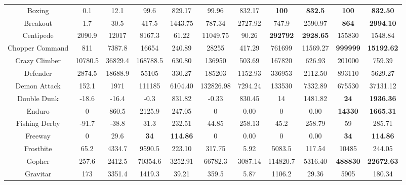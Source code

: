 \documentclass[nohyperref]{article}
\newcommand{\best}[1]{\textbf{#1}}
\theoremstyle{plain}
\begin{document}
\begin{table}[!hb]
\begin{center}
\begin{tabular}{ |c| c| c| c c| c c| c c| c c| }
 Boxing  & 0.1  & 12.1              & 99.6 & 829.17      & 99.96    & 832.17 & \textbf{100} & \textbf{832.5}        &\best{100}        &\best{832.50}        \\
 Breakout & 1.7 & 30.5              & 417.5 & 1443.75    & 787.34   & 2727.92 & 747.9 & 2590.97                     &\best{864}        &\best{2994.10}      \\
 Centipede & 2090.9 & 12017         & 8167.3 & 61.22   & 11049.75 & 90.26   & \textbf{292792} & \textbf{2928.65}    &155830            &1548.84             \\
 Chopper Command & 811 & 7387.8     & 16654 & 240.89 & 28255  & 417.29  & 761699 & 11569.27                         &\best{999999}     &\best{15192.62}     \\
 Crazy Climber & 10780.5 & 36829.4  & 168788.5 & 630.80 & 136950 & 503.69 & 167820  & 626.93                        &201000            &759.39           \\
 Defender & 2874.5 & 18688.9        & 55105 & 330.27 & 185203 & 1152.93 & 336953  & 2112.50                         &893110            &5629.27           \\
 Demon Attack & 152.1 & 1971        & 111185 & 6104.40 & 132826.98 & 7294.24 & 133530 & 7332.89                     &675530                 &37131.12       \\
 Double Dunk & -18.6 & -16.4        & -0.3   & 831.82  & -0.33     & 830.45  & 14     & 1481.82                     &\best{24}         &\best{1936.36}      \\
 Enduro      & 0   & 860.5          & 2125.9 & 247.05  & 0       & 0.00     & 0    & 0.00                           &\best{14330}      &\best{1665.31 }    \\
 Fishing Derby & -91.7 & -38.8      & 31.3 & 232.51  & 44.85   & 258.13    & 45.2   & 258.79                        &59         &285.71                 \\
 Freeway       & 0     & 29.6       & \textbf{34} & \textbf{114.86}  & 0     & 0.00       & 0    & 0.00             &\best{34}          &\best{114.86   }  \\
 Frostbite     & 65.2  & 4334.7     & 9590.5 & 223.10 & 317.75 & 5.92     & 5083.5 & 117.54                         &10485              &244.05           \\
 Gopher  & 257.6 & 2412.5           & 70354.6 & 3252.91    & 66782.3 & 3087.14 & 114820.7 & 5316.40                 &\best{488830}     &\best{22672.63}    \\
 Gravitar & 173 & 3351.4            & 1419.3  & 39.21   & 359.5      & 5.87    & 1106.2   & 29.36                   &5905       &180.34                   \\

\end{tabular}
\end{center}
\end{table}
\end{document}
